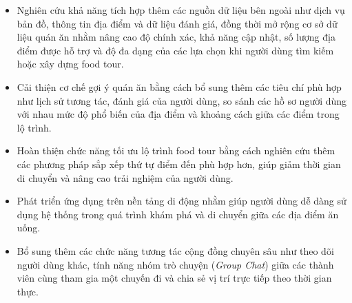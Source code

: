 \begin{itemize}

    \item Nghiên cứu khả năng tích hợp thêm các nguồn dữ liệu bên ngoài như dịch vụ bản đồ, thông tin địa điểm và dữ liệu đánh giá, đồng thời mở rộng cơ sở dữ liệu quán ăn nhằm nâng cao độ chính xác, khả năng cập nhật, số lượng địa điểm được hỗ trợ và độ đa dạng của các lựa chọn khi người dùng tìm kiếm hoặc xây dựng food tour.

    \item Cải thiện cơ chế gợi ý quán ăn bằng cách bổ sung thêm các tiêu chí
    phù hợp như lịch sử tương tác, đánh giá của người dùng, so sánh các hồ sơ 
    người dùng với nhau mức độ phổ biến của địa điểm và khoảng cách giữa các 
    điểm trong lộ trình.

    \item Hoàn thiện chức năng tối ưu lộ trình food tour bằng cách nghiên cứu
    thêm các phương pháp sắp xếp thứ tự điểm đến phù hợp hơn, giúp giảm thời
    gian di chuyển và nâng cao trải nghiệm của người dùng.

    \item Phát triển ứng dụng trên nền tảng di động nhằm giúp người dùng dễ dàng
    sử dụng hệ thống trong quá trình khám phá và di chuyển giữa các địa điểm
    ăn uống.

    \item Bổ sung thêm các chức năng tương tác cộng đồng chuyên sâu như theo dõi người
    dùng khác, tính năng nhóm trò chuyện (\textit{Group Chat}) giữa các thành viên cùng tham gia một chuyến đi và chia sẻ vị trí trực tiếp theo thời gian thực.

\end{itemize}





